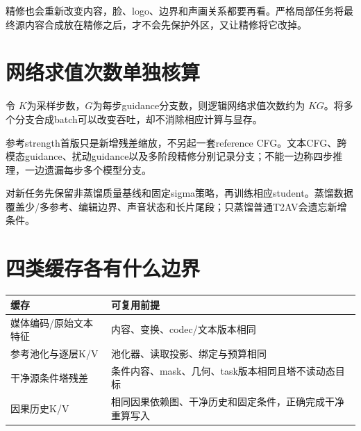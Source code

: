 精修也会重新改变内容，脸、logo、边界和声画关系都要再看。严格局部任务将最终源内容合成放在精修之后，才不会先保护外区，又让精修将它改掉。

\section{网络求值次数单独核算}\label{seedance-m26-ux7f51ux7edcux6c42ux503cux6b21ux6570ux5355ux72ecux6838ux7b97}

令 \(K\)为采样步数，\(G\)为每步guidance分支数，则逻辑网络求值次数约为 \(KG\)。将多个分支合成batch可以改变吞吐，却不消除相应计算与显存。

参考strength首版只是新增残差缩放，不另起一套reference CFG。文本CFG、跨模态guidance、扰动guidance以及多阶段精修分别记录分支；不能一边称四步推理，一边遗漏每步多个模型分支。

对新任务先保留非蒸馏质量基线和固定sigma策略，再训练相应student。蒸馏数据覆盖少/多参考、编辑边界、声音状态和长片尾段；只蒸馏普通T2AV会遗忘新增条件。

\section{四类缓存各有什么边界}\label{seedance-m26-ux56dbux7c7bux7f13ux5b58ux5404ux6709ux4ec0ux4e48ux8fb9ux754c}

{\def\LTcaptype{table} %
\small\setlength{\tabcolsep}{3pt}\renewcommand{\arraystretch}{1.18}
\begin{longtable}[]{@{}
  >{\raggedright\arraybackslash}p{}
  >{\raggedright\arraybackslash}p{}@{}}
\toprule\noalign{}
\begin{minipage}[b]{\linewidth}\raggedright
缓存
\end{minipage} & \begin{minipage}[b]{\linewidth}\raggedright
可复用前提
\end{minipage} \\
\midrule\noalign{}
\endhead
\bottomrule\noalign{}
\endlastfoot
媒体编码/原始文本特征 & 内容、变换、codec/文本版本相同 \\
参考池化与逐层K/V & 池化器、读取投影、绑定与预算相同 \\
干净源条件塔残差 & 条件内容、mask、几何、task版本相同且塔不读动态目标 \\
因果历史K/V & 相同因果依赖图、干净历史和固定条件，正确完成干净重算写入 \\
\end{longtable}
}

